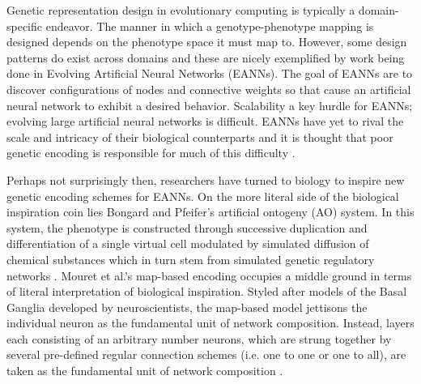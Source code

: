 Genetic representation design in evolutionary computing is typically a domain-specific endeavor.
The manner in which a genotype-phenotype mapping is designed depends on the phenotype space it must map to. However, some design patterns do exist across domains and these are nicely exemplified by work being done in Evolving Artificial Neural Networks (EANNs).
The goal of EANNs are to discover configurations of nodes and connective weights so that cause an artificial neural network to exhibit a desired behavior.
Scalability a key hurdle for EANNs; evolving large artificial neural networks is difficult. 
EANNs have yet to rival the scale and intricacy of their biological counterparts and it is thought that poor genetic encoding is responsible for much of this difficulty \cite{Tonelli2013OnNetworks}.

Perhaps not surprisingly then, researchers have turned to biology to inspire new genetic encoding schemes for EANNs.
On the more literal side of the biological inspiration coin lies Bongard and Pfeifer's artificial ontogeny (AO) system.
In this system, the phenotype is constructed through successive duplication and differentiation of a single virtual cell modulated by simulated diffusion of chemical substances which in turn stem from simulated genetic regulatory networks \cite[p 345]{Downing2015IntelligenceSystems}.
Mouret et al.'s map-based encoding occupies a middle ground in terms of literal interpretation of biological inspiration.
Styled after models of the Basal Ganglia developed by neuroscientists, the map-based model jettisons the individual neuron as the fundamental unit of network composition.
Instead, layers each consisting of an arbitrary number neurons, which are strung together by several pre-defined regular connection schemes (i.e. one to one or one to all), are taken as the fundamental unit of network composition \cite{Mouret2010ImportingGanglia}.

